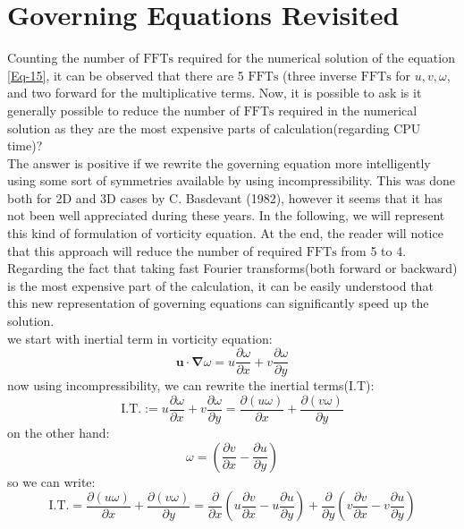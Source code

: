 \documentclass[12pt]{article}
\def\grad{\bm{\nabla}}
\def\u{\bm{u}}
\begin{document}
\section{Governing Equations Revisited}
Counting the number of $\text{FFTs}$ required for the numerical solution of the equation \eqref{Eq-15}, it can be observed that there are 5 $\text{FFTs}$ (three inverse $\text{FFTs}$ for $u,v,\omega$, and two forward for the multiplicative terms. Now, it is possible to ask is it generally possible to reduce the number of $\text{FFTs}$ required in the numerical solution as they are the most expensive parts of calculation(regarding CPU time)?\\
The answer is positive if we rewrite the governing equation more intelligently using some sort of symmetries available by using incompressibility. This was done both for 2D and 3D cases by C. Basdevant (1982), however it seems that it has not been well appreciated during these years. In the following, we will represent this kind of formulation of vorticity equation. At the end, the reader will notice that this approach will reduce the number of required $\text{FFTs}$ from 5 to 4. Regarding the fact that taking fast Fourier transforms(both forward or backward) is the most expensive part of the calculation, it can be easily understood that this new representation of governing equations can significantly speed up the solution. \\
we start with inertial term in vorticity equation:
%
\begin{equation}\label{Eq-16}
\u\cdot\grad\omega=u\dfrac{\partial \omega}{\partial x}+v\dfrac{\partial \omega}{\partial y}
\end{equation}
%
now using incompressibility, we can rewrite the inertial terms(I.T):
%
\begin{equation}\label{Eq-17}
\text{I.T.} :=u\dfrac{\partial \omega}{\partial x}+v\dfrac{\partial \omega}{\partial y}=\dfrac{\partial (u\omega)}{\partial x}+\dfrac{\partial (v\omega)}{\partial y}
\end{equation}
%
on the other hand:
%
\begin{equation}\label{Eq-18}
\omega=\left(\dfrac{\partial v}{\partial x}-\dfrac{\partial u}{\partial y}\right)
\end{equation}
%
so we can write:
%
\begin{equation}\label{Eq-19}
\text{I.T.} =\dfrac{\partial (u\omega)}{\partial x}+\dfrac{\partial (v\omega)}{\partial y}=\dfrac{\partial}{\partial x} \left(u\dfrac{\partial v}{\partial x}-u\dfrac{\partial u}{\partial y}\right)+\dfrac{\partial}{\partial y} \left(v\dfrac{\partial v}{\partial x}-v\dfrac{\partial u}{\partial y}\right)
\end{equation}
\end{document}
